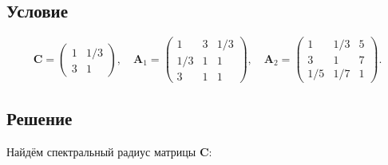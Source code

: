 \documentclass[specialist,
	substylefile = spbu_report.rtx,
	subf,href,colorlinks=true, 12pt]{disser}
\begin{document}
\subsection{Условие}

\[
	\boldsymbol{C} = \begin{pmatrix}
		1 & 1/3 \\
		3 & 1
	\end{pmatrix}, \quad
	\boldsymbol{A}_1 = \begin{pmatrix}
		1   & 3 & 1/3 \\
		1/3 & 1 & 1   \\
		3   & 1 & 1
	\end{pmatrix}, \quad
	\boldsymbol{A}_2 =  \begin{pmatrix}
		1   & 1/3 & 5 \\
		3   & 1   & 7 \\
		1/5 & 1/7 & 1
	\end{pmatrix}.
\]
\subsection{Решение}
Найдём спектральный радиус матрицы \(\boldsymbol{C}\):
\end{document}
